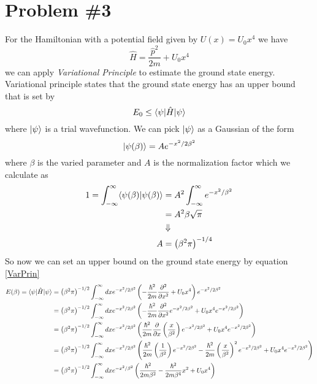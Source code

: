 \documentclass[11pt]{article}
\numberwithin{equation}{section}
\begin{document}
\section{Problem \#3}
For the Hamiltonian with a potential field given by $U(x)=U_0x^4$ we have 
$$\hat{H} = \frac{\hat{p}^2}{2m} + U_0 x^4$$
we can apply \emph{Variational Principle} to estimate the ground state energy. Variational principle states that the ground state energy has an upper bound that is set by
\begin{equation}
E_0 \le \langle{\psi}|\hat{H}|{\psi}\rangle
\label{VarPrin}
\end{equation}
where $|{\psi}\rangle$ is a trial wavefunction. We can pick $|{\psi}\rangle$ as a Gaussian of the form
$$|{\psi(\beta)}\rangle = Ae^{-x^2/2\beta^2}$$
where $\beta$ is the varied parameter and $A$ is the normalization factor which we calculate as
\begin{align*}
1 = \int_{-\infty}^{\infty}\langle{\psi(\beta)}|{\psi(\beta)}\rangle &= A^2\int_{-\infty}^{\infty}e^{-x^2/\beta^2}\\
&= A^2\beta\sqrt{\pi}\\
&\Downarrow\\
A &= \left(\beta^2{\pi}\right)^{-1/4}
\end{align*}
So now we can set an upper bound on the ground state energy by equation \ref{VarPrin}
\begin{align*}
E(\beta) = \langle{\psi}|\hat{H}|{\psi}\rangle &= \left(\beta^2{\pi}\right)^{-1/2}\int_{-\infty}^{\infty}dxe^{- x^2/2\beta^2}\left(-\frac{\hbar^2}{2m}\frac{\partial^2}{\partial x^2} + U_0 x^4\right)e^{-x^2/2\beta^2}\\
&= \left(\beta^2{\pi}\right)^{-1/2}\int_{-\infty}^{\infty}dxe^{-x^2/2\beta^2}\left(-\frac{\hbar^2}{2m}\frac{\partial^2}{\partial x^2}e^{-x^2/2\beta^2} + U_0 x^4e^{-x^2/2\beta^2}\right)\\
&= \left(\beta^2{\pi}\right)^{-1/2}\int_{-\infty}^{\infty}dxe^{-x^2/2\beta^2}\left(\frac{\hbar^2}{2m}\frac{\partial}{\partial x}\left(\frac{x}{\beta^2}\right)e^{-x^2/2\beta^2} + U_0 x^4e^{-x^2/2\beta^2}\right)\\
&= \left(\beta^2{\pi}\right)^{-1/2}\int_{-\infty}^{\infty}dxe^{-x^2/2\beta^2}\left(\frac{\hbar^2}{2m}\left(\frac{1}{\beta^2}\right)e^{-x^2/2\beta^2} - \frac{\hbar^2}{2m}\left(\frac{x}{\beta^2}\right)^2 e^{-x^2/2\beta^2} + U_0 x^4e^{-x^2/2\beta^2}\right)\\
&= \left(\beta^2{\pi}\right)^{-1/2}\int_{-\infty}^{\infty}dxe^{-x^2/\beta^2}\left(\frac{\hbar^2}{2m\beta^2} - \frac{\hbar^2}{2m\beta^4}x^2 + U_0 x^4\right)
\end{align*}
\end{document}
